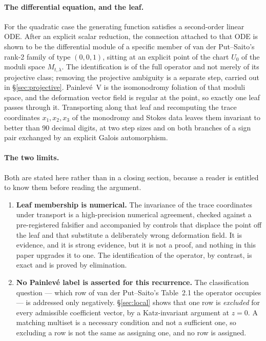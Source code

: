 \paragraph{The differential equation, and the leaf.} For the quadratic case the
generating function satisfies a second-order linear ODE. After an explicit
scalar reduction, the connection attached to that ODE is shown to be the
differential module of a specific member of van der Put--Saito's rank-2 family
of type $(0,0,1)$, sitting at an explicit point of the chart $U_0$ of the moduli
space $M_{t,\lambda}$. The identification is of the full operator and not merely
of its projective class; removing the projective ambiguity is a separate step,
carried out in \S\ref{sec:projective}. Painlev\'e~V is the isomonodromy
foliation of that moduli space, and the deformation vector field is regular at
the point, so exactly one leaf passes through it. Transporting along that leaf
and recomputing the trace coordinates $x_1,x_2,x_3$ of the monodromy and Stokes
data leaves them invariant to better than 90 decimal digits, at two step sizes
and on both branches of a sign pair exchanged by an explicit Galois
automorphism.

\paragraph{The two limits.} Both are stated here rather than in a closing
section, because a reader is entitled to know them before reading the argument.

\begin{enumerate}
\item \textbf{Leaf membership is numerical.} The invariance of the trace
  coordinates under transport is a high-precision numerical agreement, checked
  against a pre-registered falsifier and accompanied by controls that displace
  the point off the leaf and that substitute a deliberately wrong deformation
  field. It is evidence, and it is strong evidence, but it is not a proof, and
  nothing in this paper upgrades it to one. The identification of the operator,
  by contrast, is exact and is proved by elimination.

\item \textbf{No Painlev\'e label is asserted for this recurrence.} The
  classification question --- which row of van der Put--Saito's Table~2.1 the
  operator occupies --- is addressed only negatively. \S\ref{sec:local} shows
  that one row is \emph{excluded} for every admissible coefficient vector, by a
  Katz-invariant argument at $z=0$. A matching multiset is a necessary condition
  and not a sufficient one, so excluding a row is not the same as assigning one,
  and no row is assigned.
\end{enumerate}

